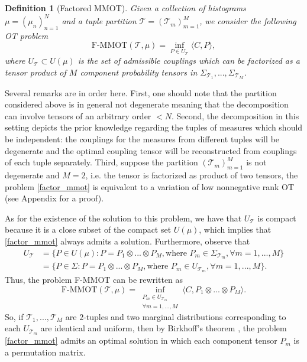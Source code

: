 \documentclass{article}
\newtheorem{definition}{Definition}[section]
\begin{document}
\begin{definition}[Factored MMOT]
  Given a collection of histograms $\mu = (\mu_n)_{n=1}^N$ and a tuple partition $\mathcal T = (\mathcal T_m)_{m=1}^M$, 
  we consider the following OT problem
\begin{equation} \label{factor_mmot}
  \text{F-MMOT}( \mathcal T, \mu) = \inf_{P \in U_{\mathcal T}} \langle C, P \rangle,
\end{equation}
where $U_{\mathcal T} \subset U(\mu)$ is the set of admissible couplings which can be factorized as a tensor product of $M$ 
component probability tensors in $\Sigma_{\mathcal T_1}, ..., \Sigma_{\mathcal T_M}$. 
\end{definition}
Several remarks are in order here. First, one should note that the partition considered above is in general not degenerate meaning 
that the decomposition can involve tensors of an arbitrary order $<N$. Second, the decomposition in this setting depicts the prior 
knowledge regarding the tuples of measures which should be independent: the couplings for the measures from different tuples will 
be degenerate and the optimal coupling tensor will be reconstructed from couplings of each tuple separately.  
Third, suppose the partition $(\mathcal T_m)_{m=1}^M$ is not degenerate and $M=2$, i.e. the tensor is factorized as product of 
two tensors, the problem \ref{factor_mmot} is equivalent to a variation of low nonnegative rank OT (see Appendix for a proof).

As for the existence of the solution to this problem, we have that $U_{\mathcal T}$ is compact because it is a close subset of the 
compact set $U(\mu)$, which implies that \ref{factor_mmot} always admits a solution. Furthermore, observe that
\begin{equation*}
  \begin{split}
    U_{\mathcal T} &= \{ P \in U(\mu): P = P_1 \otimes ... \otimes P_M, \text{where } P_m \in \Sigma_{\mathcal T_m}, \forall m = 1,...,M \} \\
    &= \{ P \in \Sigma: P = P_1 \otimes ... \otimes P_M, \text{where } P_m \in U_{\mathcal T_m}, \forall m = 1,...,M \}.
  \end{split}
\end{equation*}
Thus, the problem F-MMOT can be rewritten as
\begin{equation*}
  \text{F-MMOT}( \mathcal T, \mu) = \inf_{\substack{P_m \in U_{\mathcal T_m} \\ \forall m = 1,...,M}} 
  \langle C, P_1 \otimes ... \otimes P_M \rangle.
\end{equation*}
So, if $\mathcal T_1,...,\mathcal T_M$ are $2$-tuples and two marginal distributions corresponding to each $U_{\mathcal T_m}$ are 
identical and uniform, then by Birkhoff's theorem \citep{Birkhoff46}, the problem \ref{factor_mmot} admits an optimal solution in 
which each component tensor $P_m$ is a permutation matrix. 
\end{document}
